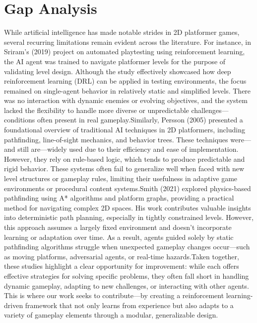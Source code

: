 \documentclass[12pt,oneside,openright,a4paper]{cpe-english-project}
\begin{document}
\section{Gap Analysis}
While artificial intelligence has made notable strides in 2D platformer games, several recurring limitations remain evident across the literature. For instance, in Sriram’s (2019) project on automated playtesting using reinforcement learning, the AI agent was trained to navigate platformer levels for the purpose of validating level design. Although the study effectively showcased how deep reinforcement learning (DRL) can be applied in testing environments, the focus remained on single-agent behavior in relatively static and simplified levels. There was no interaction with dynamic enemies or evolving objectives, and the system lacked the flexibility to handle more diverse or unpredictable challenges—conditions often present in real gameplay.Similarly, Persson (2005) presented a foundational overview of traditional AI techniques in 2D platformers, including pathfinding, line-of-sight mechanics, and behavior trees. These techniques were—and still are—widely used due to their efficiency and ease of implementation. However, they rely on rule-based logic, which tends to produce predictable and rigid behavior. These systems often fail to generalize well when faced with new level structures or gameplay rules, limiting their usefulness in adaptive game environments or procedural content systems.Smith (2021) explored physics-based pathfinding using A* algorithms and platform graphs, providing a practical method for navigating complex 2D spaces. His work contributes valuable insights into deterministic path planning, especially in tightly constrained levels. However, this approach assumes a largely fixed environment and doesn’t incorporate learning or adaptation over time. As a result, agents guided solely by static pathfinding algorithms struggle when unexpected gameplay changes occur—such as moving platforms, adversarial agents, or real-time hazards.Taken together, these studies highlight a clear opportunity for improvement: while each offers effective strategies for solving specific problems, they often fall short in handling dynamic gameplay, adapting to new challenges, or interacting with other agents. This is where our work seeks to contribute—by creating a reinforcement learning-driven framework that not only learns from experience but also adapts to a variety of gameplay elements through a modular, generalizable design.
\end{document}
